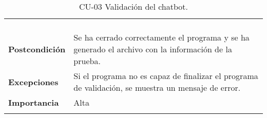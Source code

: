 \begin{longtable}[H]{@{}ll@{}}
\begin{minipage}[t]{0.71\columnwidth}
\begin{enumerate}
		\end{enumerate}\strut
	\end{minipage}\tabularnewline
	\begin{minipage}[t]{0.23\columnwidth}\raggedright\strut
		\textbf{Postcondición}\strut
	\end{minipage} & \begin{minipage}[t]{0.71\columnwidth}\raggedright\strut
		Se ha cerrado correctamente el programa y se ha generado el archivo con la información de la prueba.\strut
	\end{minipage}\tabularnewline
	\begin{minipage}[t]{0.23\columnwidth}\raggedright\strut
		\textbf{Excepciones}\strut
	\end{minipage} & \begin{minipage}[t]{0.71\columnwidth}\raggedright\strut
		Si el programa no es capaz de finalizar el programa de validación, se muestra un mensaje de error.\strut
	\end{minipage}\tabularnewline
	\begin{minipage}[t]{0.23\columnwidth}\raggedright\strut
		\textbf{Importancia}\strut
	\end{minipage} & \begin{minipage}[t]{0.71\columnwidth}\raggedright\strut
		Alta\strut
	\end{minipage}\tabularnewline
	\bottomrule
	\caption{CU-03 Validación del chatbot.}
\end{longtable}